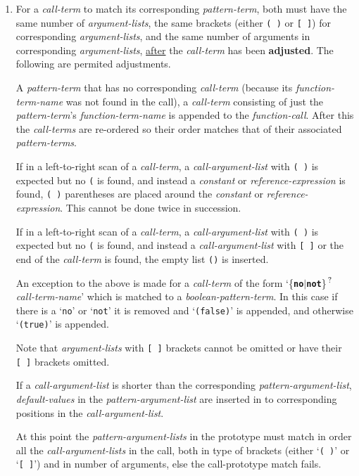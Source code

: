 \documentclass[12pt]{article}
\newcommand{\TT}[1]{{\tt \bfseries #1}}
\newcommand{\QMARK}{{$^{\,\mbox{\footnotesize ?}}$}}
\newcommand{\key}[1]{{\rm \bfseries #1}}
\begin{document}
\begin{enumerate}
\item For a {\em call-term} to match its corresponding {\em pattern-term},
both must have the same number of {\em argument-lists}, the same
brackets (either {\tt (~)} or {\tt [~]}) for corresponding
{\em argument-lists}, and the same number of
arguments in corresponding {\em argument-lists}, \underline{after}
the {\em call-term} has been \key{adjusted}.  The following are
permited adjustments.

A {\em pattern-term} that has no corresponding {\em call-term}
(because its {\em function-term-name} was not found in the call),
a {\em call-term} consisting of just the {\em pattern-term}'s
{\em function-term-name} is appended to the {\em function-call}.
After this the {\em call-terms} are re-ordered so their order
matches that of their associated {\em pattern-terms}.

If in a left-to-right scan of a {\em call-term},
a {\em call-argument-list} with {\tt (~)} is expected but no {\tt (}
is found, and instead a {\em constant} or {\em reference-expression}
is found, {\tt (~)} parentheses are placed around the
{\em constant} or {\em reference-expression}.  This cannot be
done twice in succession.

If in a left-to-right scan of a {\em call-term},
a {\em call-argument-list} with {\tt (~)} is expected but no {\tt (}
is found, and instead a {\em call-argument-list} with {\tt [~]}
or the end of the {\em call-term} is found,
the empty list {\tt ()} is inserted.

An exception to the above is made for a {\em call-term} of the
form `\{\TT{no}$|$\TT{not}\}\QMARK{} {\em call-term-name}' which
is matched to a {\em boolean-pattern-term}.  In this case if there
is a `{\tt no}' or `{\tt not}' it is removed and
`{\tt (false)}' is appended, and otherwise `{\tt (true)}' is appended.

Note that {\em argument-lists} with {\tt [~]} brackets cannot
be omitted or have their {\tt [~]} brackets omitted.

If a {\em call-argument-list} is shorter than the
corresponding {\em pattern-argument-list}, {\em default-values}
in the {\em pattern-argument-list} are inserted in to corresponding
positions in the {\em call-argument-list}.

At this point the {\em pattern-argument-lists} in the prototype
must match in order all the {\em call-argument-lists} in the call, both in
type of brackets (either `{\tt (~)}' or `{\tt [~]}') and in number
of arguments, else the call-prototype match fails.


\end{enumerate}
\end{document}
